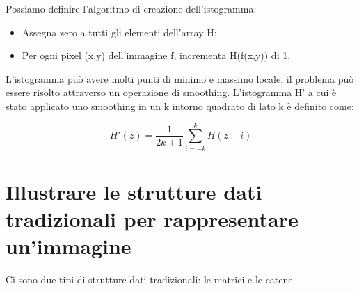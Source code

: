 Possiamo definire l'algoritmo di creazione dell'istogramma:
\begin{itemize}
\item Assegna zero a tutti gli elementi dell'array H;

\item Per ogni pixel (x,y) dell'immagine f, incrementa H(f(x,y)) di 1.
\end{itemize}

L'istogramma può avere molti punti di minimo e massimo locale, il problema può essere risolto attraverso un operazione di smoothing. L'istogramma H' a cui è stato applicato uno smoothing in un k intorno quadrato di lato k è definito come:

$$
H'(z) = \frac{1}{2k+1} \sum_{i=-k}^{k} H(z+i)
$$

\section{Illustrare le strutture dati tradizionali per rappresentare un'immagine}
Ci sono due tipi di strutture dati tradizionali: le matrici e le catene.
